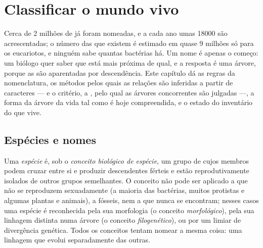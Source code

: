 \chapter{Classificar o mundo vivo}\label{ch:b1:classifying-biodiversity}

Cerca de \num{2} milhões de  já foram nomeadas, e a cada ano
umas \num{18000} são acrescentadas; o número das que existem é
estimado em quase \num{9} milhões só para os eucariotos, e ninguém
sabe quantas bactérias há. Um nome é apenas o começo: um biólogo quer
saber que  está mais próxima de qual, e a resposta é uma
árvore, porque as  são aparentadas por descendência. Este
capítulo dá as regras da nomenclatura, os métodos pelos quais as
relações são inferidas a partir de caracteres --- e o critério, a
, pelo qual as árvores concorrentes são julgadas ---, a
forma da árvore da vida tal como é hoje compreendida, e o estado do
inventário do que vive.

\section{Espécies e nomes}

\begin{definition}[Espécie]\label{def:b1:classifying-biodiversity:species}
Uma \emph{espécie} é, sob o \emph{conceito biológico de espécie}, um
grupo de  cujos membros podem cruzar entre si e produzir
descendentes férteis e estão reprodutivamente isolados de outros
grupos semelhantes. O conceito não pode ser aplicado a  que
não se reproduzem sexuadamente (a maioria das bactérias, muitos
protistas e algumas plantas e animais), a fósseis, nem a  que
nunca se encontram; nesses casos uma espécie é reconhecida pela sua
morfologia (o conceito \emph{morfológico}), pela sua linhagem distinta
numa árvore (o conceito \emph{filogenético}), ou por um limiar de
divergência genética. Todos os conceitos tentam nomear a mesma coisa:
uma linhagem que evolui separadamente das outras.
\end{definition}

